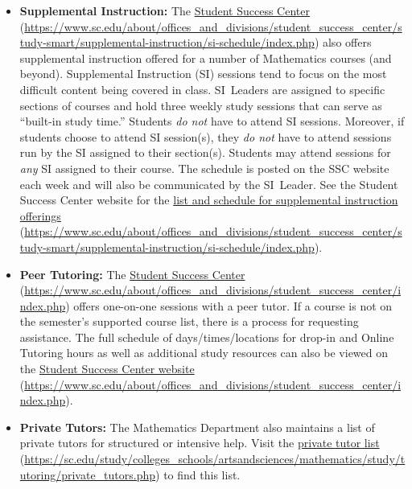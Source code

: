 \documentclass[11pt,letterpaper]{article}
\begin{document}
\begin{itemize}
	\item {\bfseries Supplemental Instruction:} The \href{https://www.sc.edu/about/offices\_and\_divisions/student\_success\_center/study-smart/supplemental-instruction/si-schedule/index.php}{Student Success Center} (\url{https://www.sc.edu/about/offices\_and\_divisions/student\_success\_center/study-smart/supplemental-instruction/si-schedule/index.php}) also offers supplemental instruction offered for a number of Mathematics courses (and beyond). Supplemental Instruction (SI) sessions tend to focus on the most difficult content being covered in class. SI~Leaders are assigned to specific sections of courses and hold three weekly study sessions that can serve as ``built-in study time.'' Students \textit{do not} have to attend SI sessions. Moreover, if students choose to attend SI session(s), they \textit{do not} have to attend sessions run by the SI assigned to their section(s). Students may attend sessions for \textit{any} SI assigned to their course. The schedule is posted on the SSC website each week and will also be communicated by the SI~Leader. See the Student Success Center website for the \href{https://www.sc.edu/about/offices\_and\_divisions/student\_success\_center/study-smart/supplemental-instruction/si-schedule/index.php}{list and schedule for supplemental instruction offerings} (\url{https://www.sc.edu/about/offices\_and\_divisions/student\_success\_center/study-smart/supplemental-instruction/si-schedule/index.php}).
		
	\item {\bfseries Peer Tutoring:} The \href{https://www.sc.edu/about/offices\_and\_divisions/student\_success\_center/index.php}{Student Success Center} (\url{https://www.sc.edu/about/offices\_and\_divisions/student\_success\_center/index.php}) offers one-on-one sessions with a peer tutor.  If a course is not on the semester's supported course list, there is a process for requesting assistance. The full schedule of days/times/locations for drop-in and Online Tutoring hours as well as additional study resources can also be viewed on the \href{https://www.sc.edu/about/offices\_and\_divisions/student\_success\_center/index.php}{Student Success Center website} (\url{https://www.sc.edu/about/offices\_and\_divisions/student\_success\_center/index.php}).





\newpage




	
	\item {\bfseries Private Tutors:} The Mathematics Department also maintains a list of private tutors for structured or intensive help. Visit the \href{https://sc.edu/study/colleges\_schools/artsandsciences/mathematics/study/tutoring/private\_tutors.php}{private tutor list} (\url{https://sc.edu/study/colleges\_schools/artsandsciences/mathematics/study/tutoring/private\_tutors.php}) to find this list. 
	

\end{itemize}
\end{document}
